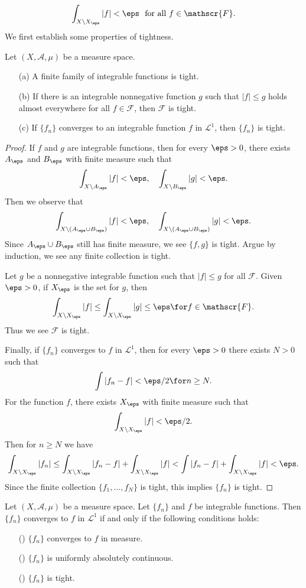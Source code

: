 \[\int_{X\setminus X_\eps}|f|<\eps\ \ \text{for all $f\in\mathscr{F}$}.\]
We first establish some properties of tightness.
\begin{proposition}\label{integrable tight prop}
Let $(X,\mathcal{A},\mu)$ be a measure space.
\begin{itemize}
\item[(a)] A finite family of integrable functions is tight.
\item[(b)] If there is an integrable nonnegative function $g$ such that $|f|\leq g$ holds almost everywhere for all $f\in\mathscr{F}$, then $\mathscr{F}$ is tight.
\item[(c)] If $\{f_n\}$ converges to an integrable function $f$ in $\mathcal{L}^1$, then $\{f_n\}$ is tight.
\end{itemize}
\end{proposition}
\begin{proof}
If $f$ and $g$ are integrable functions, then for every $\eps>0$, there exists $A_\eps$ and $B_\eps$ with finite measure such that
\[\int_{X\setminus A_\eps}|f|<\eps,\quad\int_{X\setminus B_\eps}|g|<\eps.\]
Then we observe that
\[\int_{X\setminus(A_\eps\cup B_\eps)}|f|<\eps,\quad \int_{X\setminus (A_\eps\cup B_\eps)}|g|<\eps.\]
Since $A_\eps\cup B_\eps$ still has finite measure, we see $\{f,g\}$ is tight. Argue by induction, we see any finite collection is tight.\par
Let $g$ be a nonnegative integrable function such that $|f|\leq g$ for all $\mathscr{F}$. Given $\eps>0$, if $X_\eps$ is the set for $g$, then
\[\int_{X\setminus X_\eps}|f|\leq\int_{X\setminus X_\eps}|g|\leq\eps\for f\in\mathscr{F}.\]
Thus we see $\mathscr{F}$ is tight.\par
Finally, if $\{f_n\}$ converges to $f$ in $\mathcal{L}^1$, then for every $\eps>0$ there exists $N>0$ such that
\[\int|f_n-f|<\eps/2\for n\geq N.\]
For the function $f$, there exists $X_\eps$ with finite measure such that
\[\int_{X\setminus X_\eps}|f|<\eps/2.\]
Then for $n\geq N$ we have
\[\int_{X\setminus X_\eps}|f_n|\leq\int_{X\setminus X_\eps}|f_n-f|+\int_{X\setminus X_\eps}|f|<\int|f_n-f|+\int_{X\setminus X_\eps}|f|<\eps.\]
Since the finite collection $\{f_1,\dots, f_N\}$ is tight, this implies $\{f_n\}$ is tight.
\end{proof}
\begin{theorem}\label{Vitali convergence theorem}
Let $(X,\mathcal{A},\mu)$ be a measure space. Let $\{f_n\}$ and $f$ be integrable functions. Then $\{f_n\}$ converges to $f$ in $\mathcal{L}^1$ if and only if the following conditions holds:
\begin{itemize}
\item[(\rmnum{1})] $\{f_n\}$ converges to $f$ in measure.
\item[(\rmnum{2})] $\{f_n\}$ is uniformly absolutely continuous.
\item[(\rmnum{3})] $\{f_n\}$ is tight.
\end{itemize}
\end{theorem}
